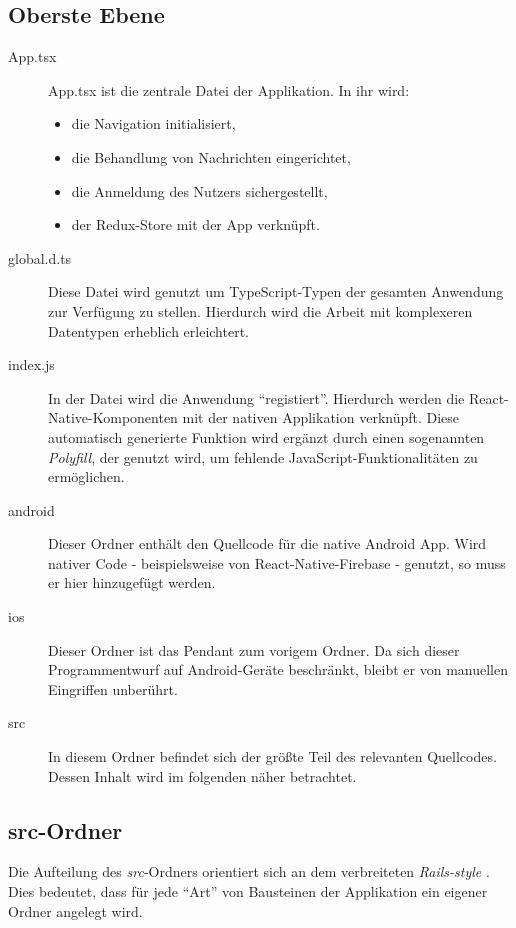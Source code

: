 \subsection{Oberste Ebene}
\begin{description}
    \item[App.tsx]
    App.tsx ist die zentrale Datei der Applikation. In ihr wird:
    \begin{itemize}
        \item die Navigation initialisiert,
        \item die Behandlung von Nachrichten eingerichtet,
        \item die Anmeldung des Nutzers sichergestellt,
        \item der Redux-Store mit der App verknüpft.
    \end{itemize}
    \item[global.d.ts]
    Diese Datei wird genutzt um TypeScript-Typen der gesamten Anwendung zur Verfügung zu stellen.
    Hierdurch wird die Arbeit mit komplexeren Datentypen erheblich erleichtert.
    \item[index.js]
    In der Datei wird die Anwendung \enquote{registiert}. Hierdurch werden die React-Native-Komponenten mit der nativen Applikation verknüpft.
    Diese automatisch generierte Funktion wird ergänzt durch einen sogenannten \emph{Polyfill}, der genutzt wird,
    um fehlende JavaScript-Funktionalitäten zu ermöglichen. \cite{undefine14:online}
    \item[android]
    Dieser Ordner enthält den Quellcode für die native Android App.
    Wird nativer Code - beispielsweise von React-Native-Firebase - genutzt,
    so muss er hier hinzugefügt werden.
    \item[ios]
    Dieser Ordner ist das Pendant zum vorigem Ordner.
    Da sich dieser Programmentwurf auf Android-Geräte beschränkt,
    bleibt er von manuellen Eingriffen unberührt.
    \item[src]
    In diesem Ordner befindet sich der größte Teil des relevanten Quellcodes.
    Dessen Inhalt wird im folgenden näher betrachtet.
\end{description}

\subsection{src-Ordner}
Die Aufteilung des \emph{src}-Ordners orientiert sich an dem verbreiteten \emph{Rails-style} \cite{CodeStru4:online}.
Dies bedeutet, dass für jede \enquote{Art} von Bausteinen der Applikation ein eigener Ordner angelegt wird.

